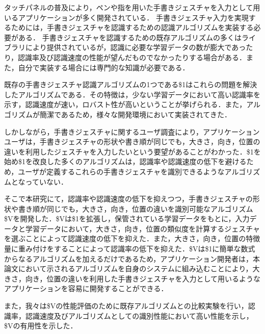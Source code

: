 タッチパネルの普及により，ペンや指を用いた手書きジェスチャを入力として用いるアプリケーションが多く開発されている．
手書きジェスチャ入力を実現するためには，手書きジェスチャを認識するための認識アルゴリズムを実装する必要がある．
手書きジェスチャを認識するための既存アルゴリズムの多くはライブラリにより提供されているが，認識に必要な学習データの数が膨大であったり，認識率及び認識速度の性能が望んだものでなかったりする場合がある．また，自分で実装する場合には専門的な知識が必要である．

既存の手書きジェスチャ認識アルゴリズムの1つである\$1はこれらの問題を解決したアルゴリズムである．その特徴は，少ない学習データにおいて高い認識率を示す，認識速度が速い，ロバスト性が高いということが挙げられる．また，アルゴリズムが簡潔であるため，様々な開発環境において実装されてきた．

しかしながら，手書きジェスチャに関するユーザ調査により，アプリケーションユーザは，手書きジェスチャの形状や書き順が同じでも，大きさ，向き，位置の違いを利用したジェスチャを入力したいという要望があることがわかった．\$1を始め\$1を改良した多くのアルゴリズムは，認識率や認識速度の低下を避けるため，ユーザが定義するこれらの手書きジェスチャを識別できるようなアルゴリズムとなっていない．

そこで本研究にて，認識率や認識速度の低下を抑えつつ，手書きジェスチャの形状や書き順が同じでも，大きさ，向き，位置の違いを識別可能なアルゴリズム\$Vを開発した．\$Vは\$1を拡張し，保管されている学習データをもとに，入力データと学習データにおいて，大きさ，向き，位置の類似度を計算するジェスチャを選ぶことによって認識速度の低下を抑えた．また，大きさ，向き，位置の特徴量に重み付けをすることによって認識率の低下を抑えた．\$Vは\$1に簡単な数式からなるアルゴリズムを加えるだけであるため，アプリケーション開発者は，本論文において示されるアルゴリズムを自身のシステムに組み込むことにより，大きさ，向き，位置の違いを利用した手書きジェスチャを入力として用いるようなアプリケーションを容易に開発することができる．

また，我々は\$Vの性能評価のために既存アルゴリズムとの比較実験を行い，認識率，認識速度及びアルゴリズムとしての識別性能において高い性能を示し，\$Vの有用性を示した．
